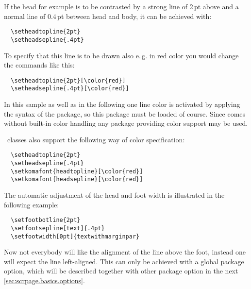\begin{Example}
If the head for example is to be contrasted by a strong line of 2\,pt
above and a normal line of 0.4\,pt between head and body, it can be
achieved with:
\begin{lstlisting}
  \setheadtopline{2pt}
  \setheadsepline{.4pt}
\end{lstlisting}
%
\begin{XmpTopPage}
        \thinlines{}
        \thicklines{}
\end{XmpTopPage}

To specify that this line is to be drawn also e.\,g. in red color you
would change the commands like this:
\begin{lstlisting}
  \setheadtopline{2pt}[\color{red}]
  \setheadsepline{.4pt}[\color{red}]
\end{lstlisting}
In this sample as well as in the following one line color is activated
by applying the syntax of the  package,
so this package must be loaded of course. Since  comes
without built-in color handling any package providing color support
may be used.

\KOMAScript\ classes also support the following way of color specification:
\begin{lstlisting}
  \setheadtopline{2pt}
  \setheadsepline{.4pt}
  \setkomafont{headtopline}[\color{red}]
  \setkomafont{headsepline}[\color{red}]
\end{lstlisting}

The automatic adjustment of the head and foot width is illustrated
in the following example:
\begin{lstlisting}
  \setfootbotline{2pt}
  \setfootsepline[text]{.4pt}
  \setfootwidth[0pt]{textwithmarginpar}
\end{lstlisting}

\label{page:scrpage.autoLineLength}
\begin{XmpBotPage}
        \thinlines{}
        \thicklines{}
\end{XmpBotPage}
\end{Example}

Now not everybody will like the alignment of the line above
the foot, instead one will expect the line left-aligned.
This can only be achieved with a global package option, which
will be described together with other package option
in the next \autoref{sec:scrpage.basics.options}.

